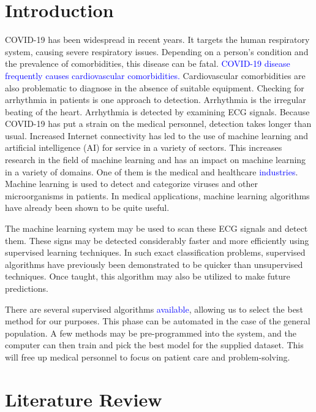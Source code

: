 \documentclass[a4paper,fleqn]{cas-dc}
\newcommand{\responsemodsm}[1]{\textcolor{blue}{#1}}
\begin{document}
% 
\section{Introduction} \label{sec:introduction}

COVID-19 has been widespread in recent years. It targets the human respiratory system, causing severe respiratory issues. Depending on a person's condition and the prevalence of comorbidities, this disease can be fatal. \responsemodsm{COVID-19 disease frequently causes cardiovascular comorbidities.} Cardiovascular comorbidities are also problematic to diagnose in the absence of suitable equipment. Checking for arrhythmia in patients is one approach to detection. Arrhythmia is the irregular beating of the heart. Arrhythmia is detected by examining ECG signals. Because COVID-19 has put a strain on the medical personnel, detection takes longer than usual. Increased Internet connectivity has led to the use of machine learning and artificial intelligence (AI) for service in a variety of sectors. This increases research in the field of machine learning and has an impact on machine learning in a variety of domains. One of them is the medical and healthcare \responsemodsm{industries}. Machine learning is used to detect and categorize viruses and other microorganisms in patients. In medical applications, machine learning algorithms have already been shown to be quite useful.

The machine learning system may be used to scan these ECG signals and detect them. These signs may be detected considerably faster and more efficiently using supervised learning techniques. In such exact classification problems, supervised algorithms have previously been demonstrated to be quicker than unsupervised techniques. Once taught, this algorithm may also be utilized to make future predictions.

There are several supervised algorithms \responsemodsm{available}, allowing us to select the best method for our purposes. This phase can be automated in the case of the general population. A few methods may be pre-programmed into the system, and the computer can then train and pick the best model for the supplied dataset. This will free up medical personnel to focus on patient care and problem-solving.

% 
\section{Literature Review} \label{sec:literature_review}
\end{document}
